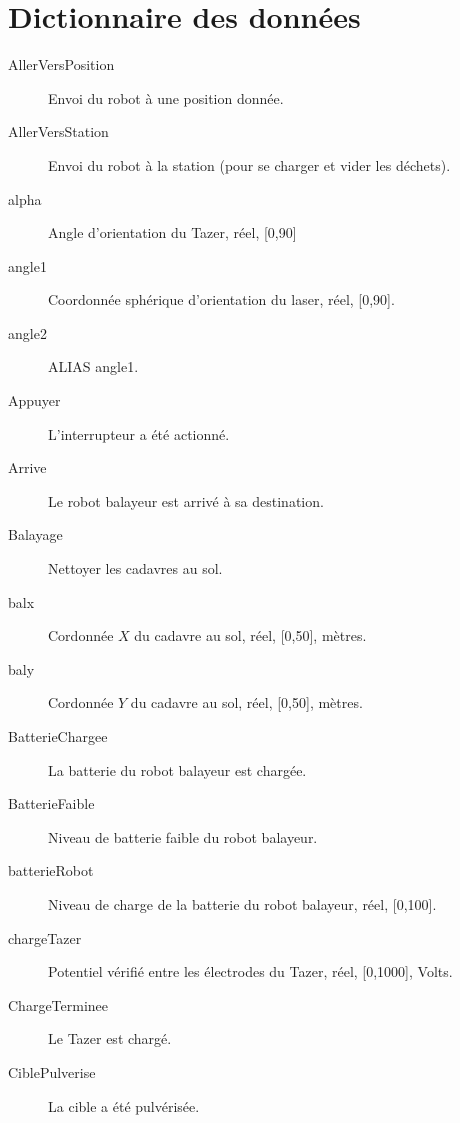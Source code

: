 \section {Dictionnaire des données}

\begin{description}
	
	\item [AllerVersPosition]\el
	Envoi du robot à une position donnée.

	\item [AllerVersStation]\el
	Envoi du robot à la station (pour se charger et vider les déchets).
	\item [alpha]\el
	Angle d'orientation du Tazer, réel, [0,90]

	\item [angle1]\el
	Coordonnée sphérique d'orientation du laser, réel, [0,90].

	\item [angle2]\el
	ALIAS angle1.

	\item [Appuyer]\el
	L'interrupteur a été actionné.

	\item [Arrive]\el
	Le robot balayeur est arrivé à sa destination.

	\item [Balayage]\el
	Nettoyer les cadavres au sol.

	\item [balx]\el
	Cordonnée $X$ du cadavre au sol, réel, [0,50], mètres.

	\item [baly]\el
	Cordonnée $Y$ du cadavre au sol, réel, [0,50], mètres.

	\item [BatterieChargee]\el
	La batterie du robot balayeur est chargée.

	\item [BatterieFaible]\el
	Niveau de batterie faible du robot balayeur.

	\item [batterieRobot]\el
	Niveau de charge de la batterie du robot balayeur, réel, [0,100].

	\item [chargeTazer]\el
	Potentiel vérifié entre les électrodes du Tazer, réel, [0,1000], Volts.

	\item [ChargeTerminee]\el
	Le Tazer est chargé.

	\item [CiblePulverise]\el
	La cible a été pulvérisée.


\end{description}

